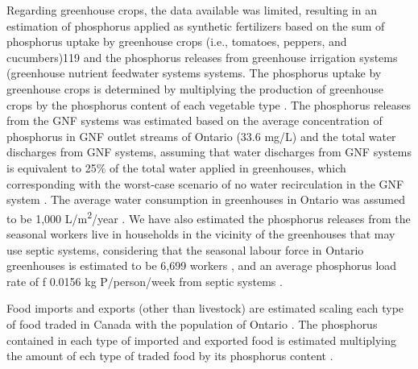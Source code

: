 \documentclass[authoryear]{elsarticle}
\begin{document}
Regarding greenhouse crops, the data available was limited, resulting in an estimation of phosphorus applied as synthetic fertilizers based on the sum of phosphorus uptake by greenhouse crops (i.e., tomatoes, peppers, and cucumbers)119 and the phosphorus releases from greenhouse irrigation systems (greenhouse nutrient feedwater systems \citep{GNFOntario} systems. The phosphorus uptake by greenhouse crops is determined by multiplying the production of greenhouse crops \citep{HorticulturalOntario} by the phosphorus content of each vegetable type \citep{USDAHandbook}. The phosphorus releases from the GNF systems was estimated based on the average concentration of phosphorus in GNF outlet streams of Ontario (33.6 mg/L) \citep{GreenhouseReleases} and the total water discharges from GNF systems, assuming that water discharges from GNF systems is equivalent to 25\% of the total water applied in greenhouses, which corresponding with the worst-case scenario of no water recirculation in the GNF system \citep{GNFOntario}. The average water consumption in greenhouses in Ontario was assumed to be 1,000 L/m\textsuperscript{2}/year \citep{GrowingVeggiesOntario}. We have also estimated the phosphorus releases from the seasonal workers live in households in the vicinity of the greenhouses that may use septic systems, considering that the seasonal labour force in Ontario greenhouses is estimated to be 6,699 workers \citep{GreenhouseWorkers}, and an average phosphorus load rate of f 0.0156 kg P/person/week from septic systems \citep{oldfield2020estimation}.

Food imports and exports (other than livestock)
are estimated scaling each type of food 
traded in Canada \citep{TradeDataOnlineCanada}
with the population of Ontario \citep{PopulationCanada}.
The phosphorus contained in each type of imported and exported food is estimated multiplying the amount of ech type of traded food by its phosphorus content \citep{CanadianNutrientFile}.
\end{document}
